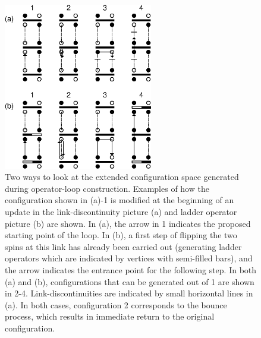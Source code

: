 \documentclass[10pt,pre,aps,twocolumn,showpacs,superscriptaddress,
floatfix]{revtex4}
\begin{document}
\begin{figure}
\includegraphics[clip,width=6.5cm]{fig5.eps}
\caption{Two ways to look at the extended configuration space generated
during operator-loop construction. Examples of how the configuration shown in
(a)-1 is modified at the beginning of an update in the link-discontinuity 
picture (a) and ladder operator picture (b) are shown. In (a), the arrow in 
1 indicates the proposed starting point of the loop. In (b), a first step of 
flipping the two spins at this link has already been carried out 
(generating ladder operators which are indicated by vertices 
with semi-filled bars), and the arrow indicates the entrance point for the 
following step. In both (a) and (b), configurations that can be generated 
out of 1 are shown in 2-4. Link-discontinuities are indicated by small
horizontal lines in (a). In both cases, configuration 2 corresponds to the 
bounce process, which results in immediate return to the original 
configuration.}
\label{lpictures}
\end{figure}
\end{document}
